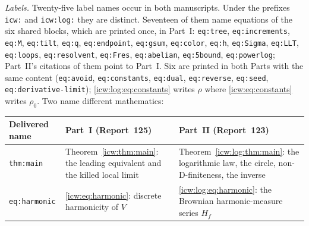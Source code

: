 \documentclass[11pt,letterpaper]{article}
\theoremstyle{remark}\newtheorem{remark}[theorem]{Remark}
\newcommand{\1}{\mathbf1}
\begin{document}
\emph{Labels.} Twenty-five label names occur in both manuscripts. Under the prefixes \texttt{icw:} and \texttt{icw:log:} they are distinct. Seventeen of them name equations of the six shared blocks, which are printed once, in Part~I: \texttt{eq:tree}, \texttt{eq:increments}, \texttt{eq:M}, \texttt{eq:tilt}, \texttt{eq:q}, \texttt{eq:endpoint}, \texttt{eq:gsum}, \texttt{eq:color}, \texttt{eq:h}, \texttt{eq:Sigma}, \texttt{eq:LLT}, \texttt{eq:loops}, \texttt{eq:resolvent}, \texttt{eq:Fres}, \texttt{eq:abelian}, \texttt{eq:5bound}, \texttt{eq:powerlog}; Part~II's citations of them point to Part~I. Six are printed in both Parts with the same content (\texttt{eq:avoid}, \texttt{eq:constants}, \texttt{eq:dual}, \texttt{eq:reverse}, \texttt{eq:seed}, \texttt{eq:derivative-limit}); \eqref{icw:log:eq:constants} writes $\rho$ where \eqref{icw:eq:constants} writes $\rho_0$. Two name different mathematics:
\begin{center}
\small
\begin{tabular}{@{}>{\raggedright\arraybackslash}p{} >{\raggedright\arraybackslash}p{} >{\raggedright\arraybackslash}p{}@{}}
\toprule
Delivered name & Part~I (Report~125) & Part~II (Report~123)\\
\midrule
\texttt{thm:main} & Theorem~\ref{icw:thm:main}: the leading equivalent and the killed local limit & Theorem~\ref{icw:log:thm:main}: the logarithmic law, the circle, non-D-finiteness, the inverse\\
\texttt{eq:harmonic} & \eqref{icw:eq:harmonic}: discrete harmonicity of $V$ & \eqref{icw:log:eq:harmonic}: the Brownian harmonic-measure series $H_f$\\
\bottomrule
\end{tabular}
\end{center}
\end{document}
